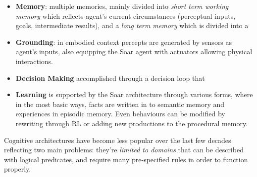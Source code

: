 \begin{itemize}
    \item \textbf{Memory}: multiple memories, mainly divided into \emph{short
        term working memory} which reflects agent's current circumstances
        (perceptual inputs, goals, intermediate results), and a \emph{long term
        memory} which is divided into a
    \item \textbf{Grounding}: in embodied context percepts are generated by
        sensors as agent's inputs, also equipping the Soar agent with actuators
        allowing physical interactions.
    \item \textbf{Decision Making} accomplished through a decision loop that
    \item \textbf{Learning} is supported by the Soar architecture through
        various forms, where in the most basic ways, facts are written in to
        semantic memory and experiences in episodic memory. Even behaviours can
        be modified by rewriting through \ac{RL} or adding new productions to
        the procedural memory.
\end{itemize}

Cognitive architectures have become less popular over the last few decades
reflecting two main problems: they're \emph{limited to domains} that can be
described with logical predicates, and require many pre-specified rules in order
to function properly.

